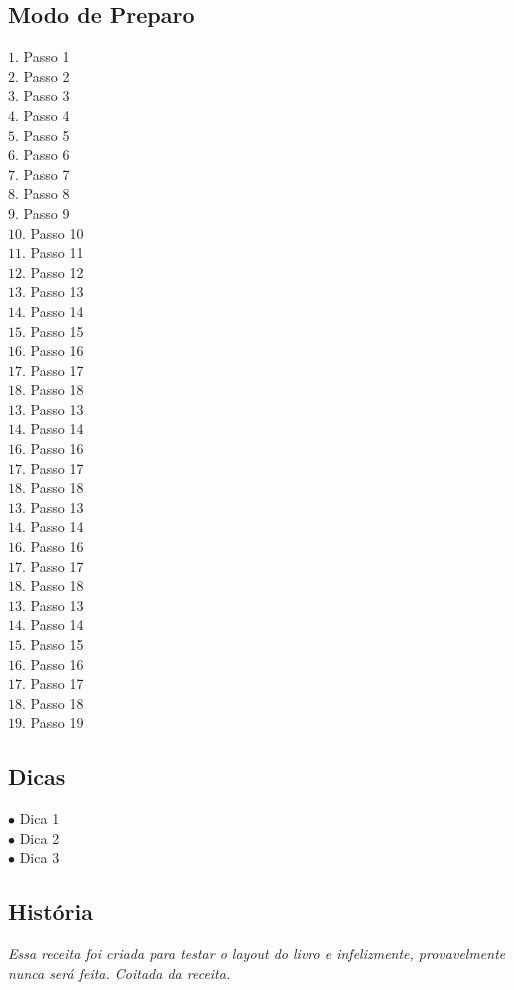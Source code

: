 \begin{aemulticol}[width=0.495\textwidth,height=0.545\textheight]
	\subsection*{\subsectionformat Modo de Preparo}
	\vspace*{-0.15cm}
	$1.$  Passo 1\\
	$2.$  Passo 2\\
	$3.$  Passo 3\\
	$4.$  Passo 4\\
	$5.$  Passo 5\\
	$6.$  Passo 6\\
	$7.$  Passo 7\\
	$8.$  Passo 8\\
	$9.$  Passo 9\\
	$10.$ Passo 10\\
	$11.$ Passo 11\\
	$12.$ Passo 12\\
	$13.$ Passo 13\\
	$14.$ Passo 14\\
	$15.$ Passo 15\\
	$16.$ Passo 16\\
	$17.$ Passo 17\\
	$18.$ Passo 18\\
	$13.$ Passo 13\\
	$14.$ Passo 14\\
	$16.$ Passo 16\\
	$17.$ Passo 17\\
	$18.$ Passo 18\\
	$13.$ Passo 13\\
	$14.$ Passo 14\\
	$16.$ Passo 16\\
	$17.$ Passo 17\\
	$18.$ Passo 18\\
	$13.$ Passo 13\\
	$14.$ Passo 14\\
	$15.$ Passo 15\\
	$16.$ Passo 16\\
	$17.$ Passo 17\\
	$18.$ Passo 18\\
	$19.$ Passo 19	

	\vspace*{-0.15cm}
	\subsection*{\subsectionformat Dicas}
	\vspace*{-0.15cm}
	
	$\bullet$ Dica 1\\
	$\bullet$ Dica 2\\
	$\bullet$ Dica 3
	
	\vspace*{-0.15cm}
	\subsection*{\subsectionformat História}
	\vspace*{-0.15cm}
	\textit{Essa receita foi criada para testar o layout do livro e infelizmente, provavelmente nunca será feita. Coitada da receita.}
\end{aemulticol}
